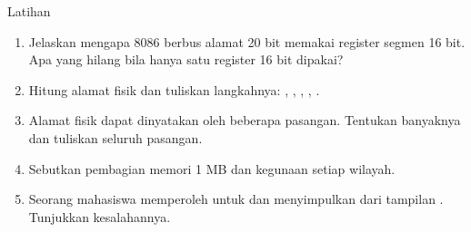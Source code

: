 \documentclass[aspectratio=169,11pt]{beamer}
\begin{document}
\begin{frame}{Latihan}
\small
\begin{enumerate}
    \item Jelaskan mengapa 8086 berbus alamat 20 bit memakai
          register segmen 16 bit. Apa yang hilang bila hanya satu
          register 16 bit dipakai?

    \vspace{0.15em}
    \item Hitung alamat fisik dan tuliskan langkahnya:
          , ,
          , ,
          .

    \vspace{0.15em}
    \item Alamat fisik  dapat dinyatakan oleh beberapa
          pasangan. Tentukan banyaknya dan tuliskan seluruh
          pasangan.

    \vspace{0.15em}
    \item Sebutkan pembagian memori 1 MB dan kegunaan setiap
          wilayah.

    \vspace{0.15em}
    \item Seorang mahasiswa memperoleh  untuk
           dan menyimpulkan  dari
          tampilan . Tunjukkan kesalahannya.
\end{enumerate}
\end{frame}
\end{document}
